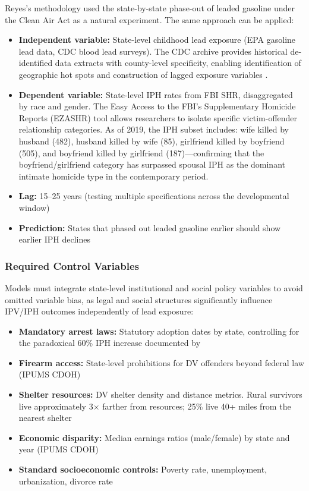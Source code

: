 \documentclass[12pt, letterpaper]{article}
\begin{document}
Reyes's \citeyearpar{reyes2007} methodology used the state-by-state phase-out of leaded gasoline under the Clean Air Act as a natural experiment. The same approach can be applied:
\begin{itemize}[nosep]
    \item \textbf{Independent variable:} State-level childhood lead exposure (EPA gasoline lead data, CDC blood lead surveys). The CDC archive provides historical de-identified data extracts with county-level specificity, enabling identification of geographic hot spots and construction of lagged exposure variables \citep{cdc_lead_archive}.
    \item \textbf{Dependent variable:} State-level IPH rates from FBI SHR, disaggregated by race and gender. The Easy Access to the FBI's Supplementary Homicide Reports (EZASHR) tool allows researchers to isolate specific victim-offender relationship categories. As of 2019, the IPH subset includes: wife killed by husband (482), husband killed by wife (85), girlfriend killed by boyfriend (505), and boyfriend killed by girlfriend (187)---confirming that the boyfriend/girlfriend category has surpassed spousal IPH as the dominant intimate homicide type in the contemporary period.
    \item \textbf{Lag:} 15--25 years (testing multiple specifications across the developmental window)
    \item \textbf{Prediction:} States that phased out leaded gasoline earlier should show earlier IPH declines
\end{itemize}

\subsubsection{Required Control Variables}

Models must integrate state-level institutional and social policy variables to avoid omitted variable bias, as legal and social structures significantly influence IPV/IPH outcomes independently of lead exposure:
\begin{itemize}[nosep]
    \item \textbf{Mandatory arrest laws:} Statutory adoption dates by state, controlling for the paradoxical 60\% IPH increase documented by \citet{iyengar2009}
    \item \textbf{Firearm access:} State-level prohibitions for DV offenders beyond federal law (IPUMS CDOH)
    \item \textbf{Shelter resources:} DV shelter density and distance metrics. Rural survivors live approximately 3$\times$ farther from resources; 25\% live 40+ miles from the nearest shelter
    \item \textbf{Economic disparity:} Median earnings ratios (male/female) by state and year (IPUMS CDOH)
    \item \textbf{Standard socioeconomic controls:} Poverty rate, unemployment, urbanization, divorce rate
\end{itemize}
\end{document}
